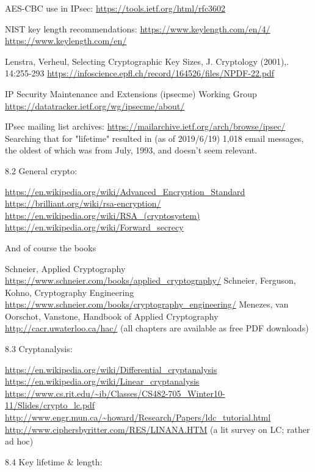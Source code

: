 \documentclass[%
 aip,
 jmp,%
 amsmath,amssymb,
 reprint,%
]{revtex4-1}
\begin{document}
AES-CBC use in IPsec:
\url{https://tools.ietf.org/html/rfc3602}

NIST key length recommendations:
\url{https://www.keylength.com/en/4/}
\url{https://www.keylength.com/en/}

Lenstra, Verheul, Selecting Cryptographic Key Sizes, J. Cryptology
(2001),. 14:255-293
\url{https://infoscience.epfl.ch/record/164526/files/NPDF-22.pdf}

IP Security Maintenance and Extensions (ipsecme) Working Group
\url{https://datatracker.ietf.org/wg/ipsecme/about/}

IPsec mailing list archives:
\url{https://mailarchive.ietf.org/arch/browse/ipsec/}
Searching that for "lifetime" resulted in (as of 2019/6/19) 1,018
email messages, the oldest of which was from July, 1993, and doesn't
seem relevant.


8.2 General crypto:

\url{https://en.wikipedia.org/wiki/Advanced_Encryption_Standard }
\url{https://brilliant.org/wiki/rsa-encryption/}
\url{https://en.wikipedia.org/wiki/RSA_(cryptosystem)}
\url{https://en.wikipedia.org/wiki/Forward_secrecy}

And of course the books

Schneier, Applied Cryptography
\url{https://www.schneier.com/books/applied_cryptography/}
Schneier, Ferguson, Kohno, Cryptography Engineering
\url{https://www.schneier.com/books/cryptography_engineering/}
Menezes, van Oorschot, Vanstone, Handbook of Applied Cryptography
\url{http://cacr.uwaterloo.ca/hac/}
(all chapters are available as free PDF downloads)

8.3 Cryptanalysis:

\url{https://en.wikipedia.org/wiki/Differential_cryptanalysis}
\url{https://en.wikipedia.org/wiki/Linear_cryptanalysis}
\url{https://www.cs.rit.edu/~ib/Classes/CS482-705_Winter10-11/Slides/crypto_lc.pdf}
\url{http://www.engr.mun.ca/~howard/Research/Papers/ldc_tutorial.html}
\url{http://www.ciphersbyritter.com/RES/LINANA.HTM} (a lit survey on LC;
rather ad hoc)

8.4 Key lifetime \& length:
\end{document}

